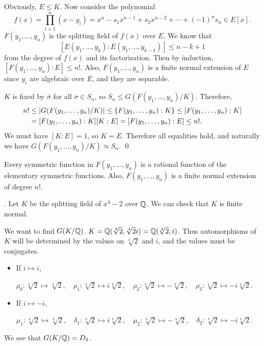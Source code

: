 \pf Obviously, \(E \leq K\). Now consider the polynomial
\[
    f(x) = \prod_{i=1}^n (x - y_i) = x^n - s_1 x^{n-1} + s_2x^{n-2} + \cdots + (-1)^n s_n \in E[x].
\]
\(F(y_1, \dots, y_n)\) is the splitting field of \(f(x)\) over \(E\). We know that
\[
    [E(y_1, \dots, y_k) : E(y_1, \dots, y_{k-1})] \leq n-k+1
\]
from the degree of \(f(x)\) and its factorization. Then by induction, \([F(y_1, \dots, y_n) : E] \leq n!\). Also, \(F(y_1, \dots, y_n)\) is a finite normal extension of \(E\) since \(y_i\) are algebraic over \(E\), and they are separable.

\(K\) is fixed by \(\bar{\sigma}\) for all \(\sigma \in S_n\), so \(S_n \leq G(F(y_1, \dots, y_n)/K)\). Therefore,
\[
    \begin{aligned}
        n! & \leq \left| G(F(y_1, \dots, y_n) / K) \right| \leq \{F(y_1, \dots, y_n) : K\}  \leq [F(y_1, \dots, y_n) : K] \\
           & = [F(y_1, \dots, y_n) : K][K : E]  =[F(y_1, \dots, y_n) : E] \leq n!.
    \end{aligned}
\]
We must have \([K : E] = 1\), so \(K = E\). Therefore all equalities hold, and naturally we have \(G(F(y_1, \dots, y_n)/K) \simeq S_n\). \qed

\rmk Every symmetric function in \(F(y_1, \dots, y_n)\) is a rational function of the elementary symmetric functions. Also, \(F(y_1, \dots, y_n)\) is a finite normal extension of degree \(n!\).

\ex. Let \(K\) be the splitting field of \(x^4 - 2\) over \(\mathbb{Q}\). We can check that \(K\) is finite normal.

We want to find \(G(K/\mathbb{Q})\). \(K = \mathbb{Q}(\sqrt[4]{2}, \sqrt[4]{2}i) = \mathbb{Q}(\sqrt[4]{2}, i)\). Thus automorphisms of \(K\) will be determined by the values on \(\sqrt[4]{2}\) and \(i\), and the values must be conjugates.
\begin{itemize}
    \item If \(i \mapsto i\),
          \begin{center}
              \(\rho_0 : \sqrt[4]{2} \mapsto \sqrt[4]{2}, \quad \rho_1 : \sqrt[4]{2} \mapsto i\sqrt[4]{2}, \quad  \rho_2 : \sqrt[4]{2} \mapsto -\sqrt[4]{2}, \quad \rho_3 : \sqrt[4]{2} \mapsto -i\sqrt[4]{2}\).
          \end{center}
    \item If \(i \mapsto -i\),
          \begin{center}
              \(\mu_1 : \sqrt[4]{2} \mapsto \sqrt[4]{2}, \quad \delta_1 : \sqrt[4]{2} \mapsto i\sqrt[4]{2}, \quad  \mu_2 : \sqrt[4]{2} \mapsto -\sqrt[4]{2}, \quad \delta_2 : \sqrt[4]{2} \mapsto -i\sqrt[4]{2}\).
          \end{center}
\end{itemize}

We see that \(G(K/\mathbb{Q}) = D_4\).

\smallskip
